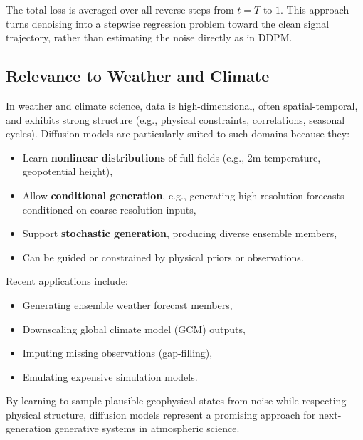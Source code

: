 The total loss is averaged over all reverse steps from \( t = T \) to \( 1 \). This approach turns denoising into a stepwise regression problem toward the clean signal trajectory, rather than estimating the noise directly as in DDPM.

%
\subsection{Relevance to Weather and Climate}

In weather and climate science, data is high-dimensional, often spatial-temporal, and exhibits strong structure (e.g., physical constraints, correlations, seasonal cycles). Diffusion models are particularly suited to such domains because they:

\begin{itemize}
\item Learn \textbf{nonlinear distributions} of full fields (e.g., 2m temperature, geopotential height),
\item Allow \textbf{conditional generation}, e.g., generating high-resolution forecasts conditioned on coarse-resolution inputs,
\item Support \textbf{stochastic generation}, producing diverse ensemble members,
\item Can be guided or constrained by physical priors or observations.
\end{itemize}

Recent applications include:
\begin{itemize}
\item Generating ensemble weather forecast members,
\item Downscaling global climate model (GCM) outputs,
\item Imputing missing observations (gap-filling),
\item Emulating expensive simulation models.
\end{itemize}

By learning to sample plausible geophysical states from noise while respecting physical structure, diffusion models represent a promising approach for next-generation generative systems in atmospheric science.

